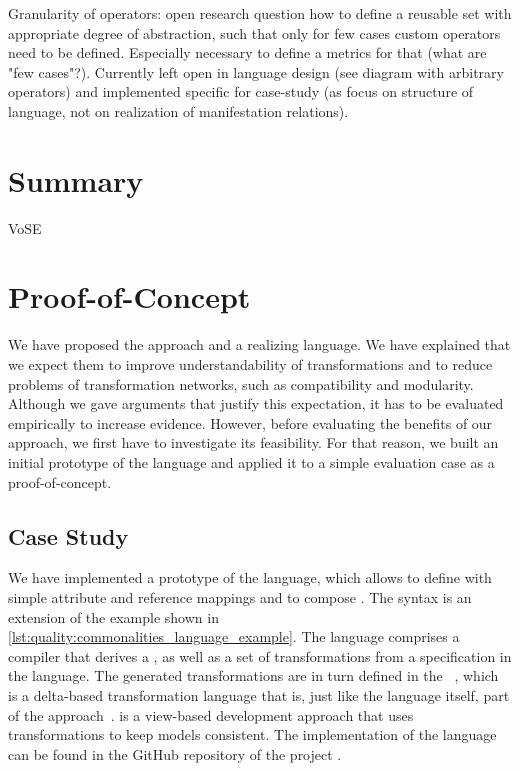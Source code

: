 Granularity of operators: open research question how to define a reusable set with appropriate degree of abstraction, such that only for few cases custom operators need to be defined. Especially necessary to define a metrics for that (what are "few cases"?). Currently left open in language design (see diagram with arbitrary operators) and implemented specific for case-study (as focus on structure of language, not on realization of manifestation relations).


\section{Summary}



\begin{copiedFrom}{VoSE}

\section*{Proof-of-Concept}

We have proposed the \commonalities approach and a realizing language.
We have explained that we expect them to improve understandability of transformations and to reduce problems of transformation networks, such as compatibility and modularity.
Although we gave arguments that justify this expectation, it has to be evaluated empirically to increase evidence.
However, before evaluating the benefits of our approach, we first have to investigate its feasibility.
For that reason, we built an initial prototype of the language and applied it to a simple evaluation case as a proof-of-concept.



\subsection*{Case Study}

We have implemented a prototype of the \commonalities language, which allows to define \commonalities with simple attribute and reference mappings and to compose \commonalities.
The syntax is an extension of the example shown in \autoref{lst:quality:commonalities_language_example}.
The language comprises a compiler that derives a \conceptmetamodel, as well as a set of transformations from a specification in the language.
The generated transformations are in turn defined in the \reactionslanguage~\cite{klare2016b}, which is a delta-based transformation language that is, just like the \commonalities language itself, part of the \vitruv approach~\cite{kramer2013b}.
\vitruv is a view-based development approach that uses transformations to keep models consistent.
The implementation of the \commonalities language can be found in the GitHub repository of the \vitruv project \cite{vitruvFrameworkGithub}. %


\end{copiedFrom}
